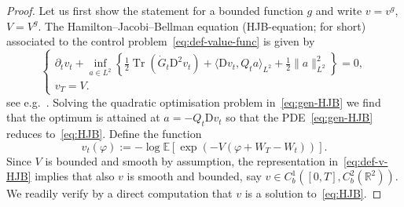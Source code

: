 \documentclass[11pt, a4paper]{scrartcl}
\numberwithin{equation}{section}
\theoremstyle{plain}
\theoremstyle{remark}
\newcommand{\assign}{:=}
\newcommand{\mathD}{\mathrm{D}}
\newcommand{\tmop}[1]{\ensuremath{\operatorname{#1}}}
\begin{document}
\begin{proof}
  Let us first show the statement for a bounded function $g$ and write $v =
  v^g$, $V = V^g$. The Hamilton--Jacobi--Bellman equation (HJB-equation; for
  short) associated to the control problem~\eqref{eq:def-value-func} is given
  by
  \begin{equation}
    \begin{cases}
      \partial_t v_t + \inf_{a \in L^2} \left\{ \frac{1}{2} \tmop{Tr}
      (\dot{G}_t \mathD^2 v_t) + \langle \mathD v_t, Q_t a \rangle_{L^2} +
      \frac{1}{2} \| a \|_{L^2}^2 \right\} = 0, \label{eq:gen-HJB}\\
      v_T = V.
    \end{cases}
  \end{equation}
  see e.g.~{\cite[Section~2.5.1]{fabbriStochasticOptimalControl2017}}. Solving
  the quadratic optimisation problem in~\eqref{eq:gen-HJB} we find that the
  optimum is attained at $a = - Q_t \mathD v_t$ so that the
  PDE~\eqref{eq:gen-HJB} reduces to~\eqref{eq:HJB}. Define the function
  \begin{equation}
    v_t (\varphi) \assign - \log \mathbb{E} [\exp (- V (\varphi + W_T - W_t))]
    . \label{eq:def-v-HJB}
  \end{equation}
  Since $V$ is bounded and smooth by assumption, the representation
  in~\eqref{eq:def-v-HJB} implies that also $v$ is smooth and bounded, say $v
  \in C^1_b ([0, T], C^2_b (\mathbb{R}^2))$. We readily verify by a direct
  computation that $v$ is a solution to~\eqref{eq:HJB}.
  

\end{proof}
\end{document}
